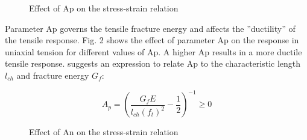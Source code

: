 \begin{figure}[!htbp]
  \caption{ Effect of Ap on the stress-strain relation}
  \label{fig:Ap}
\end{figure}

Parameter Ap governs the tensile fracture energy and affects the ”ductility” of the tensile response. Fig. 2 shows the effect of parameter Ap on the response in uniaxial tension for different values of Ap. A higher Ap results in a more ductile tensile response. \cite{faria1998strain} suggests an expression to relate Ap to the characteristic length $l_{ch}$ and fracture energy $G_f$:

\begin{equation}
A_p=\left(\frac{G_fE}{l_{ch}(f_t)^2}-\frac{1}{2}\right)^{-1}\geq 0
\end{equation}




\begin{figure}[!htbp]
  \caption{ Effect of An on the stress-strain relation}
  \label{fig:An}
\end{figure}

